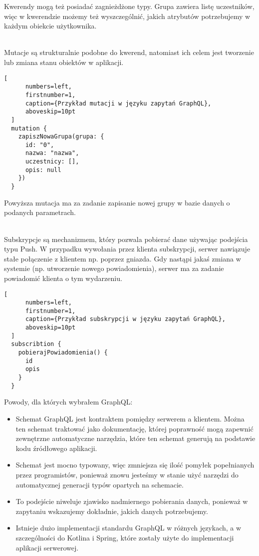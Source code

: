 \begin{description}[leftmargin={15pt},labelindent={0pt}]
  Kwerendy mogą też posiadać zagnieżdżone typy. Grupa zawiera listę uczestników, więc w kwerendzie możemy też wyszczególnić, jakich atrybutów potrzebujemy w każdym obiekcie użytkownika.
  \newline
  \item[Mutacje] \hfill \\ Mutacje są strukturalnie podobne do kwerend, natomiast ich celem jest tworzenie lub zmiana stanu obiektów w aplikacji.
  \clearpage
  \begin{addmargin}[6mm]{0mm}
  \begin{lstlisting}[
      numbers=left,
      firstnumber=1,
      caption={Przykład mutacji w języku zapytań GraphQL},
      aboveskip=10pt
  ]
  mutation {
    zapiszNowaGrupa(grupa: {
      id: "0",
      nazwa: "nazwa",
      uczestnicy: [],
      opis: null
    })
  }
  \end{lstlisting}
  \end{addmargin}
  Powyższa mutacja ma za zadanie zapisanie nowej grupy w bazie danych o podanych parametrach.

\vspace{0.4cm}


\item[Subskrypcje] \hfill \\ Subskrypcje są mechanizmem, który pozwala pobierać dane używając podejścia typu Push. W przypadku wywołania przez klienta subskrypcji, serwer nawiązuje stałe połączenie z klientem np. poprzez gniazda. Gdy nastąpi jakaś zmiana w systemie (np. utworzenie nowego powiadomienia), serwer ma za zadanie powiadomić klienta o tym wydarzeniu.
  \begin{addmargin}[6mm]{0mm}
  \begin{lstlisting}[
      numbers=left,
      firstnumber=1,
      caption={Przykład subskrypcji w języku zapytań GraphQL},
      aboveskip=10pt
  ]
  subscribtion {
    pobierajPowiadomienia() {
      id
      opis
    }
  }
  \end{lstlisting}
  \end{addmargin}
\end{description}
Powody, dla których wybrałem GraphQL:
\begin{itemize}
  \item Schemat GraphQL jest kontraktem pomiędzy serwerem a klientem. Można ten schemat traktować jako dokumentację, której poprawność mogą zapewnić zewnętrzne automatyczne narzędzia, które ten schemat generują na podstawie kodu źródłowego aplikacji.
  \item Schemat jest mocno typowany, więc zmniejsza się ilość pomyłek popełnianych przez programistów, ponieważ znowu jesteśmy w stanie użyć narzędzi do automatycznej generacji typów opartych na schemacie.
  \item To podejście niweluje zjawisko nadmiernego pobierania danych, ponieważ w zapytaniu wskazujemy dokładnie, jakich danych potrzebujemy.
  \item Istnieje dużo implementacji standardu GraphQL w różnych językach, a w szczególności do Kotlina i Spring, które zostały użyte do implementacji aplikacji serwerowej.
\end{itemize}

